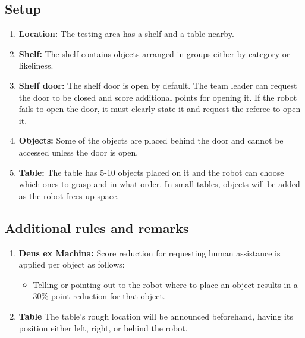 \subsection{Setup}
\begin{enumerate}
	\item \textbf{Location:} The testing area has a shelf and a table nearby.

	\item \textbf{Shelf:} The shelf contains objects arranged in groups either by category or likeliness.

	\item \textbf{Shelf door:} The shelf door is open by default.
	The team leader can request the door to be closed and score additional points for opening it. If the robot fails to open the door, it must clearly state it and request the referee to open it.

	\item \textbf{Objects:} Some of the objects are placed behind the door and cannot be accessed unless the door is open.

	\item \textbf{Table:} The table has 5-10 objects placed on it and the robot can choose which ones to grasp and in what order. In small tables, objects will be added as the robot frees up space.
\end{enumerate}


%
%
\subsection{Additional rules and remarks}
\begin{enumerate}
		\item \textbf{Deus ex Machina:} Score reduction for requesting human assistance is applied per object as follows:
	\begin{itemize}[nosep]
		\item Telling or pointing out to the robot where to place an object results in a 30\% point reduction for that object.
	\end{itemize}

	\item \textbf{Table} The table's rough location will be announced beforehand, having its position either left, right, or behind the robot.
\end{enumerate}

